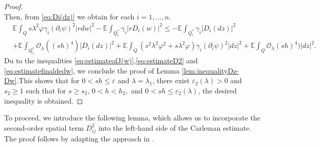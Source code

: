\documentclass[11pt,oneside,leqno]{amsart}
\numberwithin{equation}{section}
\numberwithin{equation}{section}
\newcommand{\E}{\mathbb{E}}
\begin{document}
\begin{proof}
\begin{equation*}
\end{equation*}
Then, from \eqref{eq:Di(dz)} we obtain for each $i{ =1,...,n.}$
\begin{equation}\label{eq:estimatefinaldedw}
\begin{split}
&\E\int_{Q}s\lambda^2\varphi\gamma_i(\partial_i\psi)^2|rdw|^2-\E\int_{Q_i^{\ast}}\gamma_i|rD_i(w)|^2\leq -\E\int_{Q_i^{\ast}}\gamma_i|D_i(dz)|^2\\
&+\E\int_{Q_i^{\ast}}\mathcal{O}_{\lambda}((sh)^4)|D_i(dz)|^2+\E\int_{Q}\left(s^2\lambda^2\varphi^2+s\lambda^2\varphi\right)\gamma_i(\partial_i\psi)^2|dz|^2+\E\int_{Q}\mathcal{O}_{\lambda}(sh)^4)|dz|^2.
\end{split}
\end{equation}
Du to the inequalities \eqref{eq:estimateofJ(w)},\eqref{eq:estimateD2} and \eqref{eq:estimatefinaldedw}, we conclude the proof of Lemma \eqref{lem:inequalityDz-Dw}.This shows that for $0<sh\leq \varepsilon$ and $\lambda=\lambda_1$, there exist $\varepsilon_2(\lambda)>0$ and $s_2\geq1$ such that for $s\geq s_2$, $0<h<h_2,$ and $0<sh\leq\varepsilon_2(\lambda)$, the desired inequality is obtained.
\end{proof}

To proceed, we introduce the following lemma, which allows us to incorporate the second-order spatial term $D_{ij}^2$ into the left-hand side of the Carleman estimate. The proof follows by adapting the approach in \cite[Theorem 1.2]{LLRP:2025}.
\end{document}
